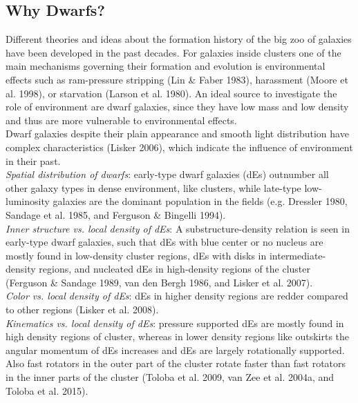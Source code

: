 \documentclass{aa}
\begin{document}
\subsection{Why Dwarfs?}

Different theories and ideas about the formation history of the big zoo of galaxies have been developed in the past decades. For galaxies inside clusters one of the main mechanisms governing their formation and evolution is environmental effects such as ram-pressure stripping (Lin \& Faber 1983), harassment (Moore et al. 1998), or starvation (Larson et al. 1980). An ideal source to investigate the role of environment are dwarf galaxies, since they have low mass and low density and thus are more vulnerable to environmental effects. \\
Dwarf galaxies despite their plain appearance and smooth light distribution have complex characteristics (Lisker 2006), which indicate the influence of environment in their past. \\ \textit{Spatial distribution of dwarfs}: early-type dwarf galaxies (dEs) outnumber all other galaxy types in dense environment, like clusters, while late-type low-luminosity galaxies are the dominant population in the fields (e.g. Dressler 1980, Sandage et al. 1985, and Ferguson \& Bingelli 1994).\\ \textit{Inner structure vs. local density of dEs}: A substructure-density relation is seen in early-type dwarf galaxies, such that dEs with blue center or no nucleus are mostly found in low-density cluster regions, dEs with disks in intermediate-density regions, and nucleated dEs in high-density regions of the cluster (Ferguson \& Sandage 1989, van den Bergh 1986, and Lisker et al. 2007). \\ \textit{Color vs. local density of dEs}: dEs in higher density regions are redder compared to other regions (Lisker et al. 2008). \\ \textit{Kinematics vs. local density of dEs}: pressure supported dEs are mostly found in high density regions of cluster, whereas in lower density regions like outskirts the angular momentum of dEs increases and dEs are largely rotationally supported. Also fast rotators in the outer part of the cluster rotate faster than fast rotators in the inner parts of the cluster (Toloba et al. 2009, van Zee et al. 2004a, and Toloba et al. 2015).\\
\end{document}
